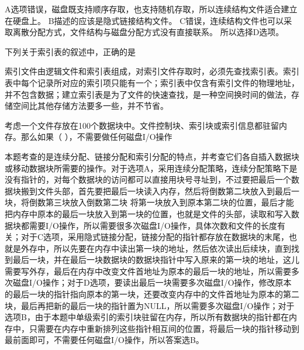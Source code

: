 \begin{solution}A选项错误，磁盘既支持顺序存取，也支持随机存取，所以连续结构文件适合建立在硬盘上。
B描述的应该是隐式链接结构文件。
C错误，连续结构文件也可以采取离散分配方式，文件结构与磁盘分配方式没有直接联系。
所以选择D选项。
\end{solution}
\question 下列关于索引表的叙述中，正确的是
\par{}
\begin{solution}索引文件由逻辑文件和索引表组成，对索引文件存取时，必须先查找索引表。索引表中每个记录所对应的索引项只能有一个；索引表中仅含有索引文件的物理地址，并不包含数据；建立索引表是为了文件的快速查找，是一种空间换时间的做法，存储空间比其他存储方法要多一些，并不节省。
\end{solution}
\question 考虑一个文件存放在100个数据块中。文件控制块、索引块或索引信息都驻留内存。那么如果（
），不需要做任何磁盘I/O操作
\par{}
\begin{solution}本题考查的是连续分配、链接分配和索引分配的特点，并考查它们各自插入数据块或移动数据块所需要的操作。对于选项A，采用连续分配策略，连续分配策略下是没有指针的，对每个数据块的访问都可以直接用块号寻址到，不过要把最后一个数据块搬到文件头部，首先要把最后一块读入内存，然后将倒数第二块放入到最后一块，将倒数第三块放入倒数第二块
将第一块放入到原本第二块的位置，最后才能把内存中原本的最后一块放入到第一块的位置，也就是文件的头部，读取和写入数据块都需要I/O操作，所以需要很多次磁盘I/O操作，具体次数和文件的长度有关；对于C选项，采用隐式链接分配，链接分配的指针都存放在数据块的末尾，也就是外存中，所以先要在内存中读出第一块的地址，然后依次读出后续块，直到找到最后一块，并在最后一块数据块的数据块指针中写入原来的第一块的地址，这儿需要写外存，最后在内存中改变文件首地址为原本的最后一块的地址，所以需要多次磁盘I/O操作；对于D选项，要读出最后一块需要多次磁盘I/O操作，修改原本的最后一块的指针指向原本的第一块，还要改变内存中的文件首地址为原本的第二块，最后再把新的最后一块的指针置为NULL，所以需要多次磁盘I/O操作；对于选项B，由于本题中单级索引的索引块驻留在内存，所以所有数据块的指针都在内存中，只需要在内存中重新排列这些指针相互间的位置，将最后一块的指针移动到最前面即可，不需要任何磁盘I/O操作，所以答案选B。
\end{solution}
